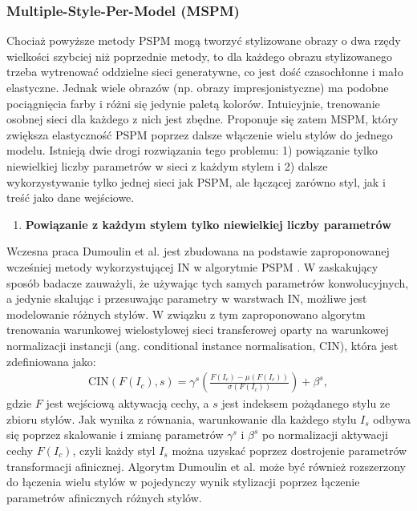 \documentclass[12pt]{article}
\begin{document}
\subsubsection{Multiple-Style-Per-Model (MSPM)}

Chociaż powyższe metody PSPM mogą tworzyć stylizowane obrazy o dwa rzędy wielkości szybciej niż poprzednie metody, to dla każdego obrazu stylizowanego trzeba wytrenować oddzielne sieci generatywne, co jest dość czasochłonne i mało elastyczne. Jednak wiele obrazów (np. obrazy impresjonistyczne) ma podobne pociągnięcia farby i różni się jedynie paletą kolorów. Intuicyjnie, trenowanie osobnej sieci dla każdego z nich jest zbędne. Proponuje się zatem MSPM, który zwiększa elastyczność PSPM poprzez dalsze włączenie wielu stylów do jednego modelu. Istnieją dwie drogi rozwiązania tego problemu: 1) powiązanie tylko niewielkiej liczby parametrów w sieci z każdym stylem i 2) dalsze wykorzystywanie tylko jednej sieci jak PSPM, ale łączącej zarówno styl, jak i treść jako dane wejściowe.

\begin{enumerate}
    \item \textbf{Powiązanie z każdym stylem tylko niewielkiej liczby parametrów}
\end{enumerate}   

Wczesna praca Dumoulin et al. jest zbudowana na podstawie zaproponowanej wcześniej metody wykorzystującej IN w algorytmie PSPM \cite{43}. W zaskakujący sposób badacze zauważyli, że używając tych samych parametrów konwolucyjnych, a jedynie skalując i przesuwając parametry w warstwach IN, możliwe jest modelowanie różnych stylów. W związku z tym zaproponowano algorytm trenowania warunkowej wielostylowej sieci transferowej oparty na warunkowej normalizacji instancji (ang. conditional instance normalisation, CIN), która jest zdefiniowana jako:
\begin{align*}
    \text{CIN}\left(F\left(I_c\right),s\right)= \gamma^s\left( \frac{F\left(I_c\right)-\mu\left(F\left(I_c\right)\right)}{\sigma\left(F\left(I_c\right)\right)}\right)+\beta^s,
\end{align*}
gdzie $F$ jest wejściową aktywacją cechy, a $s$ jest indeksem pożądanego stylu ze zbioru stylów. Jak wynika z równania, warunkowanie dla każdego stylu $I_s$ odbywa się poprzez skalowanie i zmianę parametrów $\gamma^s$ i $\beta^s$ po normalizacji aktywacji cechy $F(I_c)$, czyli każdy styl $I_s$ można uzyskać poprzez dostrojenie parametrów transformacji afinicznej. Algorytm Dumoulin et al. może być również rozszerzony do łączenia wielu stylów w pojedynczy wynik stylizacji poprzez łączenie parametrów afinicznych różnych stylów.
\end{document}
